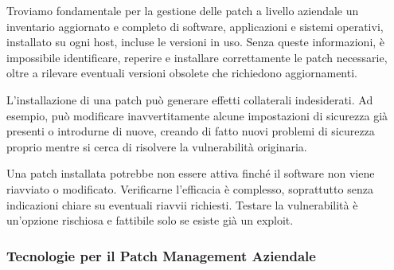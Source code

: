                 Troviamo fondamentale per la  gestione delle patch a livello aziendale un inventario aggiornato e completo di software, applicazioni e sistemi operativi, installato su ogni host, incluse le versioni in uso. Senza queste informazioni, è impossibile identificare, reperire e installare correttamente le patch necessarie, oltre a rilevare eventuali versioni obsolete che richiedono aggiornamenti.

                L'installazione di una patch può generare effetti collaterali indesiderati. Ad esempio, può modificare inavvertitamente alcune impostazioni di sicurezza già presenti o introdurne di nuove, creando di fatto nuovi problemi di sicurezza proprio mentre si cerca di risolvere la vulnerabilità originaria.

                Una patch installata potrebbe non essere attiva finché il software non viene riavviato o modificato. Verificarne l'efficacia è complesso, soprattutto senza indicazioni chiare su eventuali riavvii richiesti. Testare la vulnerabilità è un'opzione rischiosa e fattibile solo se esiste già un exploit.

                \subsubsection{Tecnologie per il Patch Management Aziendale}
                
